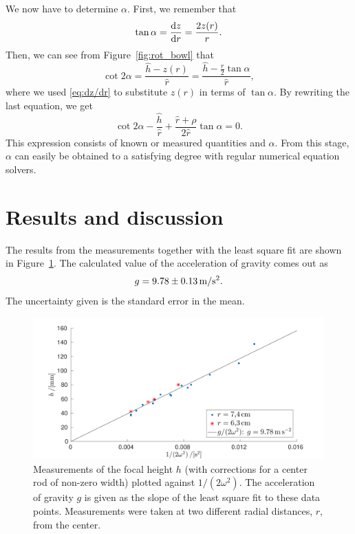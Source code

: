 \documentclass[12pt, a4paper, twocolumn]{article}
\begin{document}
We now have to determine $\alpha$. First, we remember that
\begin{equation}\label{eq:dz/dr}
\tan\alpha=\dv{z}{r} =\frac{2 z(r)}{r}.
\end{equation}
Then, we can see from Figure~\ref{fig:rot_bowl} that 
\begin{equation}
\cot 2\alpha =\frac{\hat{h} - z(r)}{\hat{r}} 
= \frac{\hat{h}-\frac{r}{2}\tan\alpha }{\hat{r}},
\end{equation}
where we used \eqref{eq:dz/dr} to substitute $z(r)$ in terms of $\tan\alpha$. By rewriting the last equation, we get
\begin{equation}
\cot 2\alpha 
-\frac{\hat{h}}{\hat{r}}
+\frac{\hat{r}+\rho}{2\hat{r}}\tan\alpha  = 0.
\end{equation}
This expression consists of known or measured quantities and $\alpha$. From this stage, $\alpha$ can easily be obtained to a satisfying degree with regular numerical equation solvers.


\section{Results and discussion}

The results from the measurements together with the least square fit are shown in Figure~\ref{fig:data}. The calculated value of the acceleration of gravity comes out as
\begin{equation}
g=\unit[9.78\pm 0.13]{m/s^2}.
\end{equation}
The uncertainty given is the standard error in the mean.

\begin{figure}\centering 
\includegraphics[width=12cm]{fig5_data.pdf}
\caption{
Measurements of the focal height $h$ (with corrections for a center rod of non-zero width) plotted against $1/(2\omega^2)$. The acceleration of gravity $g$ is given as the slope of the least square fit to these data points. Measurements were taken at two different radial distances, $r$, from the center.}
\label{fig:data} 
\end{figure}
\end{document}
